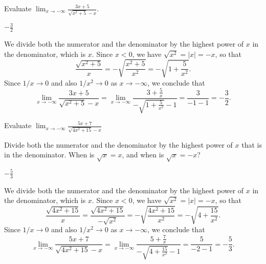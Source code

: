 \begin{question}[2015Q]
Evaluate $\displaystyle \lim_{x\to -\infty} \frac{3x+5}{\sqrt{x^2+5}-x}$.
\end{question}
\begin{answer}
$-\frac{3}{2}$
\end{answer}
\begin{solution}
We divide both the numerator and the denominator by the
             highest power of $x$ in the denominator, which is $x$.
             Since $x<0$, we have $\sqrt{x^2}=|x|=-x$,
             so that
$$\frac{\sqrt{x^2+5}}{x}=-\sqrt{\frac{x^2+5}{x^2}}=-\sqrt{1+\frac{5}{x^2}}.$$
Since $1/x\to 0$ and also $1/x^2\to 0$ as $x\to -\infty$, we conclude that
$$\lim_{x\to -\infty} \frac{3x+5}{\sqrt{x^2+5}-x}=\lim_{x\to -\infty}\frac{3+\frac{5}{x}}{-\sqrt{1+\frac{5}{x^2}}-1}=\frac{3}{-1-1}=-\frac{3}{2}.$$
\end{solution}



\begin{question}[2015Q]
Evaluate
$\displaystyle\lim_{x\rightarrow -\infty} \frac{5x+7}{\sqrt{4x^2+15}-x}$
\end{question}
\begin{hint}
Divide both the numerator and the denominator by the highest
         power of $x$ that is in the denominator.
         When is $\sqrt{x}=x$, and when is $\sqrt{x}=-x$?
\end{hint}
\begin{answer} $-\frac{5}{3}$
\end{answer}
\begin{solution}
We divide both the numerator and the denominator by the
             highest power of $x$ in the denominator, which is $x$.
             Since $x<0$, we have $\sqrt{x^2}=|x|=-x$,
             so that
             $$\frac{\sqrt{4x^2+15}}{x}=
\frac{\sqrt{4x^2+15}}{-\sqrt{x^2}}
=-\sqrt{\frac{4x^2+15}{x^2}}=-\sqrt{4+\frac{15}{x^2}}.$$
Since $1/x\to 0$ and also $1/x^2\to 0$ as $x\to -\infty$, we conclude that
$$\lim_{x\to -\infty} \frac{5x+7}{\sqrt{4x^2+15}-x}=\lim_{x\to
-\infty}\frac{5+\frac{7}{x}}{-\sqrt{4+\frac{15}{x^2}}-1}=\frac{5}{-2-1}=-\frac{5}{3}.$$
\end{solution}


